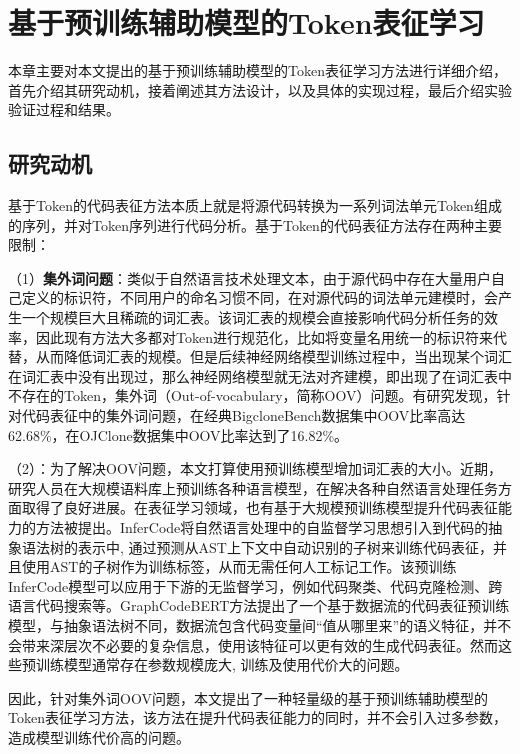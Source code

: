 \chapter{基于预训练辅助模型的Token表征学习}
\label{chap:Token}
本章主要对本文提出的基于预训练辅助模型的Token表征学习方法进行详细介绍，首先介绍其研究动机，接着阐述其方法设计，以及具体的实现过程，最后介绍实验验证过程和结果。

\section{研究动机}
\label{sec:TokenMotivation}

基于Token的代码表征方法本质上就是将源代码转换为一系列词法单元Token组成的序列，并对Token序列进行代码分析。基于Token的代码表征方法存在两种主要限制：

（1）\textbf{集外词问题}：类似于自然语言技术处理文本，由于源代码中存在大量用户自己定义的标识符，不同用户的命名习惯不同，在对源代码的词法单元建模时，会产生一个规模巨大且稀疏的词汇表。该词汇表的规模会直接影响代码分析任务的效率，因此现有方法大多都对Token进行规范化，比如将变量名用统一的标识符来代替，从而降低词汇表的规模。但是后续神经网络模型训练过程中，当出现某个词汇在词汇表中没有出现过，那么神经网络模型就无法对齐建模，即出现了在词汇表中不存在的Token，集外词（Out-of-vocabulary，简称OOV）问题。有研究\cite{RJXB202205011}发现，针对代码表征中的集外词问题，在经典BigcloneBench\cite{7332459}数据集中OOV比率高达62.68\%，在OJClone数据集\cite{WOS:000485474201046}中OOV比率达到了16.82\%。

（2）：为了解决OOV问题，本文打算使用预训练模型增加词汇表的大小。近期，研究人员在大规模语料库上预训练各种语言模型，在解决各种自然语言处理任务方面取得了良好进展\cite{zhao2023survey}。在表征学习领域，也有基于大规模预训练模型提升代码表征能力的方法被提出。InferCode\cite{9402028}将自然语言处理中的自监督学习思想引入到代码的抽象语法树的表示中, 通过预测从AST上下文中自动识别的子树来训练代码表征，并且使用AST的子树作为训练标签，从而无需任何人工标记工作。该预训练InferCode模型可以应用于下游的无监督学习，例如代码聚类、代码克隆检测、跨语言代码搜索等。GraphCodeBERT\cite{guo2021graphcodebert}方法提出了一个基于数据流的代码表征预训练模型，与抽象语法树不同，数据流包含代码变量间“值从哪里来”的语义特征，并不会带来深层次不必要的复杂信息，使用该特征可以更有效的生成代码表征。然而这些预训练模型通常存在参数规模庞大, 训练及使用代价大的问题。

因此，针对集外词OOV问题，本文提出了一种轻量级的基于预训练辅助模型的Token表征学习方法，该方法在提升代码表征能力的同时，并不会引入过多参数，造成模型训练代价高的问题。

